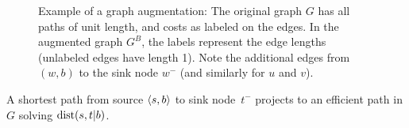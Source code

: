 
\begin{figure}
	
	\caption{Example of a graph augmentation: The original graph $G$ has all paths of unit length, and costs as labeled on the edges. In the augmented graph $G^B$, the labels represent the edge lengths (unlabeled edges have length 1). Note the additional edges from $(w,b)$ to the sink node $w^-$ (and similarly for $u$ and $v$). 
	}
	\label{fig:augmented}
\end{figure}




\begin{proposition}\label{prop:shorteffic}
	A shortest path from source $\langle s,b\rangle$ to sink node~$t^-$ projects to an efficient path in $G$ solving $\mbox{dist}(s,t|b)$. 
\end{proposition}

